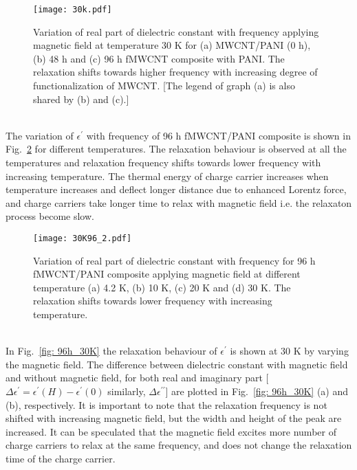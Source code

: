 \documentclass[journal=jaccck,manuscript=article]{achemso}
\begin{document}
\begin{figure}[tbh!]
	\begin{center}
		\texttt{[image: 30k.pdf]}
		\small{\caption{Variation of real part of dielectric constant with frequency applying magnetic field at temperature 30 K for (a) MWCNT/PANI (0 h), (b) 48 h and (c) 96 h fMWCNT composite with PANI. The relaxation shifts towards higher frequency with increasing degree of functionalization of MWCNT. [The legend of graph (a) is also shared by (b) and (c).] \label{fig: 30k}}}
	\end{center}
\end{figure}
\\The variation of $\epsilon^\prime$ with frequency of 96 h fMWCNT/PANI composite is shown in Fig.~\ref{fig: 96h} for different temperatures. The relaxation behaviour is observed at all the temperatures and relaxation frequency shifts towards lower frequency with increasing temperature. The thermal energy of charge carrier increases when temperature increases and deflect longer distance due to enhanced Lorentz force, and charge carriers take longer time to relax with magnetic field i.e. the relaxaton process become slow. 
\begin{figure}[tbh!]
	\begin{center}
		\texttt{[image: 30K96\_2.pdf]}
		\small{\caption{ Variation of real part of dielectric constant with frequency for 96 h fMWCNT/PANI composite applying magnetic field at different temperature (a) 4.2 K, (b) 10 K, (c) 20 K and (d) 30 K. The relaxation shifts towards lower frequency with increasing temperature.  \label{fig: 96h}}}
	\end{center}
\end{figure}
\\In Fig.~\ref{fig: 96h_30K} the relaxation behaviour of $\epsilon^\prime$ is shown at 30 K by varying the magnetic field. The difference between dielectric constant with magnetic field and without magnetic field, for both real and imaginary part [$\Delta\epsilon^\prime = \epsilon^\prime (H) - \epsilon^\prime (0)$ similarly, $\Delta\epsilon^{\prime\prime}$] are plotted in Fig.~\ref{fig: 96h_30K} (a) and (b), respectively. It is important to note that the relaxation frequency is not shifted with increasing magnetic field, but the width and height of the peak are increased. It can be speculated that the magnetic field excites more number of charge carriers to relax at the same frequency, and does not change the relaxation time of the charge carrier. 
\end{document}
